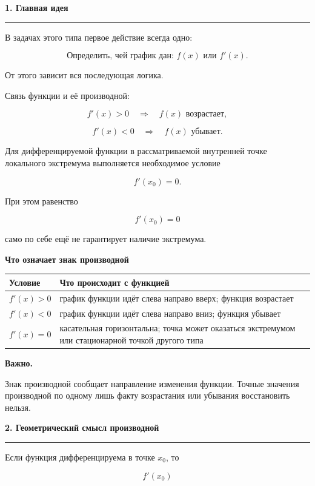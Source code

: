 \documentclass[a4paper,12pt]{article}
\newcommand{\maintitle}[1]{%
    {\Large\bfseries\color{darkaccent}#1\par}
    \vspace{2mm}
    {\color{accent}\rule{\linewidth}{0.6pt}}
    \vspace{4mm}
}
\newcommand{\subhead}[1]{%
    \vspace{3mm}
    {\large\bfseries\color{darkaccent}#1\par}
    \vspace{1mm}
}
\newcommand{\keypoint}[1]{%
    \par
    \vspace{1mm}
    {\color{darkaccent}\bfseries #1}
}
\begin{document}
\maintitle{1. Главная идея}

В задачах этого типа первое действие всегда одно:

\[
\boxed{\text{Определить, чей график дан: }f(x)\text{ или }f'(x).}
\]

От этого зависит вся последующая логика.

Связь функции и её производной:

\[
f'(x)>0
\quad\Longrightarrow\quad
f(x)\text{ возрастает},
\]

\[
f'(x)<0
\quad\Longrightarrow\quad
f(x)\text{ убывает}.
\]

Для дифференцируемой функции в рассматриваемой внутренней точке локального
экстремума выполняется необходимое условие

\[
f'(x_0)=0.
\]

При этом равенство

\[
f'(x_0)=0
\]

само по себе ещё не гарантирует наличие экстремума.

\subhead{Что означает знак производной}

\begin{center}
\begin{tabularx}{0.92\linewidth}{@{}>{\bfseries}l X@{}}
\toprule
Условие & Что происходит с функцией \\
\midrule
$f'(x)>0$ &
график функции идёт слева направо вверх; функция возрастает \\

$f'(x)<0$ &
график функции идёт слева направо вниз; функция убывает \\

$f'(x)=0$ &
касательная горизонтальна; точка может оказаться экстремумом или стационарной точкой другого типа \\
\bottomrule
\end{tabularx}
\end{center}

\keypoint{Важно.}
Знак производной сообщает направление изменения функции.
Точные значения производной по одному лишь факту возрастания или убывания
восстановить нельзя.

\maintitle{2. Геометрический смысл производной}

Если функция дифференцируема в точке \(x_0\), то

\[
f'(x_0)
\]
\end{document}
